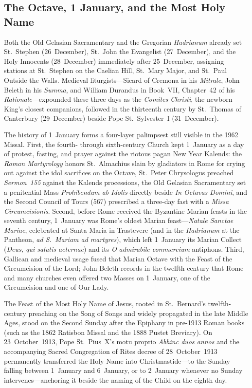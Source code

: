 \subsection{The Octave, 1 January, and the Most Holy Name}

Both the Old Gelasian Sacramentary and the Gregorian \textit{Hadrianum} already
set St.~Stephen (26~December), St.~John the Evangelist (27~December), and the
Holy Innocents (28~December) immediately after 25~December, assigning stations
at St.~Stephen on the Caelian Hill, St.~Mary Major, and St.~Paul Outside the
Walls. Medieval liturgists---Sicard of Cremona in his \textit{Mitrale}, John
Beleth in his \textit{Summa}, and William Durandus in Book~VII, Chapter~42 of
his \textit{Rationale}---expounded these three days as the \textit{Comites
Christi}, the newborn King's closest companions, followed in the thirteenth
century by St.~Thomas of Canterbury (29~December) beside Pope St.~Sylvester~I
(31~December).

The history of 1~January forms a four-layer palimpsest still visible in the
1962 Missal. First, the fourth- through sixth-century Church kept 1~January as a
day of protest, fasting, and prayer against the riotous pagan New Year Kalends:
the \textit{Roman Martyrology} honors St.~Almachius slain by gladiators in Rome
for crying out against the idol sacrifices on the Octave, St.~Peter Chrysologus
preached \textit{Sermon~155} against the Kalends processions, the Old Gelasian
Sacramentary set a penitential Mass \textit{Prohibendum ab Idolis} directly
beside \textit{In Octavas Domini}, and the Second Council of Tours (567)
prescribed a three-day fast with a \textit{Missa Circumcisionis}. Second, before
Rome received the Byzantine Marian feasts in the seventh century, 1~January was
Rome's oldest Marian feast---\textit{Natale Sanctae Mariae}, celebrated at
Santa Maria in Trastevere (and in the \textit{Hadrianum} at the Pantheon,
\textit{ad S.~Mariam ad martyres}), which left 1~January its Marian Collect
(\textit{Deus, qui salutis aeternae}) and its \textit{O admirabile commercium}
antiphons. Third, Gallican and medieval usage fused that Marian Octave with the
Feast of the Circumcision of the Lord; John Beleth records in the twelfth
century that Rome and many churches even offered two Masses on 1~January, one of
the Circumcision and one of Our Lady.

The Feast of the Most Holy Name of Jesus, rooted in St.~Bernard's twelfth-century
preaching on the Song of Songs and widely propagated in the late Middle Ages,
stood on the Second Sunday after the Epiphany in pre-1913 Roman books (such as
the 1862 Ratisbon Missal and the 1888 Pustet Breviary). On 23~October~1913, Pope
St.~Pius~X's motu proprio \textit{Abhinc duos annos} and the accompanying Sacred
Congregation of Rites decree of 28~October~1913 permanently transferred the Holy
Name into Christmastide---to the Sunday falling between 1~January and 6~January,
or to 2~January whenever no Sunday intervenes---anchoring it beside the naming
of the Child on the eighth day.

